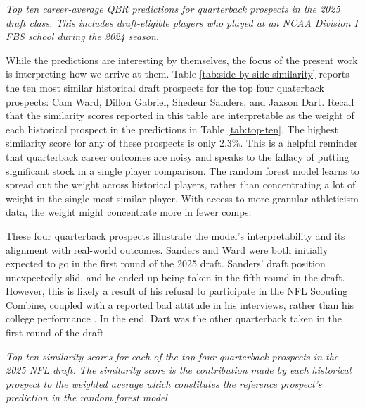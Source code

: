 \documentclass[Review, sageh, times]{sagej}
\begin{document}
\begin{table}[H]
  \centering
  
  \caption{\it Top ten career-average QBR predictions for quarterback prospects in the 2025 draft class. This includes draft-eligible players who played at an NCAA Division I FBS school during the 2024 season.}
  \label{tab:top-ten}
\end{table}

While the predictions are interesting by themselves, the focus of the present work is interpreting how we arrive at them. Table \ref{tab:side-by-side-similarity} reports the ten most similar historical draft prospects for the top four quaterback prospects: Cam Ward, Dillon Gabriel, Shedeur Sanders, and Jaxson Dart. Recall that the similarity scores reported in this table are interpretable as the weight of each historical prospect in the predictions in Table \ref{tab:top-ten}. The highest similarity score for any of these prospects is only 2.3\%. This is a helpful reminder that quarterback career outcomes are noisy and speaks to the fallacy of putting significant stock in a single player comparison. The random forest model learns to spread out the weight across historical players, rather than concentrating a lot of weight in the single most similar player. With access to more granular athleticism data, the weight might concentrate more in fewer comps.

These four quarterback prospects illustrate the model's interpretability and its alignment with real-world outcomes. Sanders and Ward were both initially expected to go in the first round of the 2025 draft. Sanders' draft position unexpectedly slid, and he ended up being taken in the fifth round in the draft. However, this is likely a result of his refusal to participate in the NFL Scouting Combine, coupled with a reported bad attitude in his interviews, rather than his college performance \citep{mckenna_what_2025}. In the end, Dart was the other quarterback taken in the first round of the draft.

\begin{table}[H]
  \resizebox{\textwidth}{!}{
    
  }
  \caption{\it Top ten similarity scores for each of the top four quarterback prospects in the 2025 NFL draft. The similarity score is the contribution made by each historical prospect to the weighted average which constitutes the reference prospect's prediction in the random forest model.}
  \label{tab:side-by-side-similarity}
\end{table}
\end{document}
